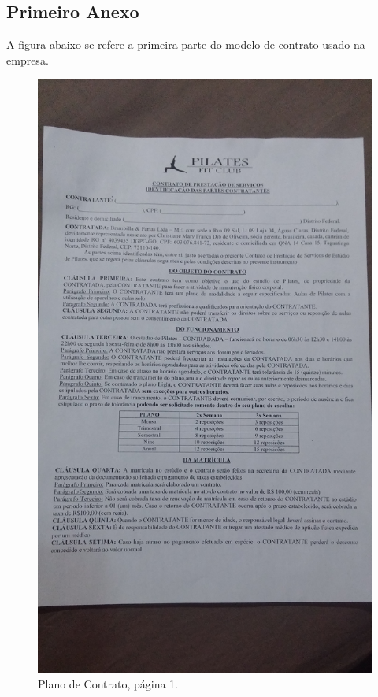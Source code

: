 \begin{anexosenv}
\partanexos
\chapter{Primeiro Anexo}
A figura abaixo se refere a primeira parte do modelo de contrato usado na empresa.
\begin{figure}[h!]
    \centering
    \includegraphics[width=\textwidth, angle=-90]{figuras/contrato_1.jpg}
    \caption{Plano de Contrato, página 1.}
    \label{fig:contrato_1}
\end{figure}

\end{anexosenv}
